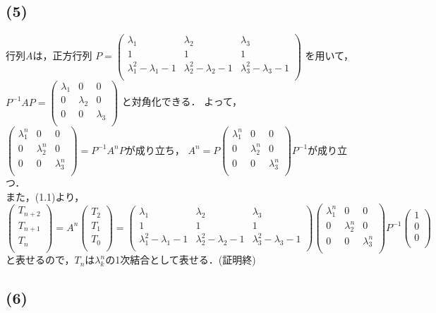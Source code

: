 \documentclass[uplatex]{jsarticle}
\begin{document}
\subsection*{(5)}
行列$A$は，正方行列
$P=
\begin{pmatrix}
	\lambda_1 & \lambda_2 & \lambda_3 \\
	1 & 1 & 1 \\
	\lambda_1^2-\lambda_1-1 & \lambda_2^2-\lambda_2-1 & \lambda_3^2-\lambda_3-1 \\
\end{pmatrix}
$
を用いて，\\
$P^{-1}AP =
\begin{pmatrix}
	\lambda_1 & 0 & 0 \\
	0 & \lambda_2 & 0 \\
	0 & 0 & \lambda_3 \\
\end{pmatrix} 
$
と対角化できる．
よって，
$\begin{pmatrix}
	\lambda_1^n & 0 & 0 \\
	0 & \lambda_2^n & 0 \\
	0 & 0 & \lambda_3^n \\
\end{pmatrix}
=P^{-1}A^nP$が成り立ち，
$
A^n=
P
\begin{pmatrix}
	\lambda_1^n & 0 & 0 \\
	0 & \lambda_2^n & 0 \\
	0 & 0 & \lambda_3^n \\
\end{pmatrix}
P^{-1}
$が成り立つ．\\
また，(1.1)より，
$$
\begin{pmatrix}
	T_{n+2} \\
	T_{n+1} \\
	T_{n} \\
\end{pmatrix}
= A^n
\begin{pmatrix}
	T_2 \\
	T_1 \\
	T_0 \\
\end{pmatrix}
=
\begin{pmatrix}
	\lambda_1 & \lambda_2 & \lambda_3 \\
	1 & 1 & 1 \\
	\lambda_1^2-\lambda_1-1 & \lambda_2^2-\lambda_2-1 & \lambda_3^2-\lambda_3-1 \\
\end{pmatrix}
\begin{pmatrix}
	\lambda_1^n & 0 & 0 \\
	0 & \lambda_2^n & 0 \\
	0 & 0 & \lambda_3^n \\
\end{pmatrix}
P^{-1}
\begin{pmatrix}
	1 \\
	0 \\
	0 \\
\end{pmatrix}
$$
と表せるので，$T_n$は$\lambda_k^n$の1次結合として表せる．(証明終)

\subsection*{(6)}
\end{document}
